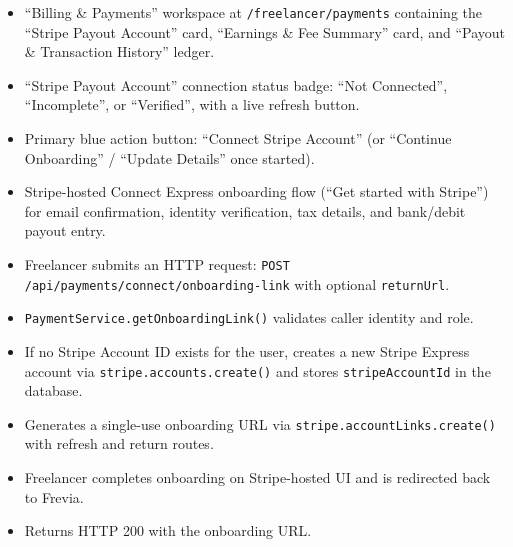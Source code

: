 \begin{itemize}[leftmargin=1.6em,topsep=3pt,itemsep=2pt,parsep=0pt,label=$\bullet$]
      \item ``Billing \& Payments'' workspace at \texttt{/freelancer/payments} containing the ``Stripe Payout Account'' card, ``Earnings \& Fee Summary'' card, and ``Payout \& Transaction History'' ledger.
      \item ``Stripe Payout Account'' connection status badge: ``Not Connected'', ``Incomplete'', or ``Verified'', with a live refresh button.
      \item Primary blue action button: ``Connect Stripe Account'' (or ``Continue Onboarding'' / ``Update Details'' once started).
      \item Stripe-hosted Connect Express onboarding flow (``Get started with Stripe'') for email confirmation, identity verification, tax details, and bank/debit payout entry.
\end{itemize}

\begin{itemize}[leftmargin=1.6em,topsep=3pt,itemsep=2pt,parsep=0pt,label=$\bullet$]
      \item Freelancer submits an HTTP request: \texttt{POST /api/payments/connect/onboarding-link} with optional \texttt{returnUrl}.
      \item \texttt{PaymentService.getOnboardingLink()} validates caller identity and role.
      \item If no Stripe Account ID exists for the user, creates a new Stripe Express account via \texttt{stripe.accounts.create()} and stores \texttt{stripeAccountId} in the database.
      \item Generates a single-use onboarding URL via \texttt{stripe.accountLinks.create()} with refresh and return routes.
      \item Freelancer completes onboarding on Stripe-hosted UI and is redirected back to Frevia.
      \item Returns HTTP 200 with the onboarding URL.
\end{itemize}

